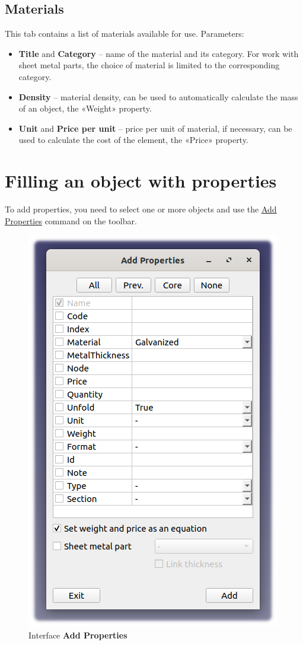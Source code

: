\documentclass[a4paper,12pt]{article}
\begin{document}
\subsection{Materials}
This tab contains a list of materials available for use. Parameters:
\begin{itemize}
    \item \textbf{Title} and \textbf{Category} -- name of the material and its category. For work with sheet metal parts, the choice of material is limited to the corresponding category.
    \item \textbf{Density} -- material density, can be used to automatically calculate the mass of an object, the «Weight» property.
    \item \textbf{Unit} and \textbf{Price per unit} -- price per unit of material, if necessary, can be used to calculate the cost of the element, the «Price» property.
\end{itemize}

\pagebreak




\section{Filling an object with properties}

To add properties, you need to select one or more objects and use the \hyperref[sec:5]{Add Properties} command on the toolbar.

\begin{figure}[htp]
	\centering
	\includegraphics[scale=0.75]{img/properties_add.png}
	\caption{Interface \textbf{Add Properties}}
	\label{sec:properties_add}
\end{figure}
\end{document}
